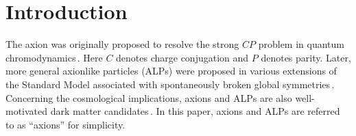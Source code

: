 \documentclass[universe,article,submit,oneauthor]{Definitions/mdpi}
\begin{document}
\maketitle



\section{Introduction}

The axion was originally proposed to resolve the strong $CP$ problem in quantum chromodynamics\,\cite{PecceiQuinn1977_ConstraintsCP_PRD,Weinberg1978_NewLightBoson,PecceiQuinn1977_CPConservation_PRL,Wilczek1978_ProblemStrongPAndT}. 
Here $C$ denotes charge conjugation and $P$ denotes parity. 
Later, more general axionlike particles (ALPs) were proposed in various extensions of the Standard Model associated with spontaneously broken global symmetries\,\cite{svrcek2006axions,Kim1987_LightPseudoscalars,JaeckelRingwald2010_ALPReview,Arvanitaki2010_StringAxiverse}. 
Concerning the cosmological implications, axions and ALPs are also well-motivated dark matter candidates\,\cite{Preskill1983_invisible_axion,Abbott1983_CosmologicalBoundAxion,Dine1983_not_so_harmless_axion,Marsh2016_AxionCosmology}.
In this paper, axions and ALPs are referred to as ``axions'' for simplicity. 
\end{document}
